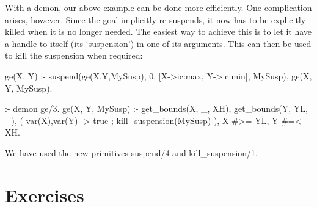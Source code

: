 With a demon, our above example can be done more
efficiently. One complication arises, however. Since the goal
implicitly re-suspends, it now has to be explicitly killed when
it is no longer needed. The easiest way to achieve this is to
let it have a handle to itself (its `suspension') in one of its arguments.
This can then be used to kill the suspension when required:
\begin{code}
ge(X, Y) :-
        suspend(ge(X,Y,MySusp), 0, [X->ic:max, Y->ic:min], MySusp),
        ge(X, Y, MySusp).

:- demon ge/3.
ge(X, Y, MySusp) :-
        get_bounds(X, _, XH),
        get_bounds(Y, YL, _),
        ( var(X),var(Y) ->
            true     %
        ;
            kill_suspension(MySusp)
        ),
        X #>= YL,    %
        Y #=< XH.
\end{code}
We have used the new primitives suspend/4 and kill_suspension/1.



\section{Exercises}

